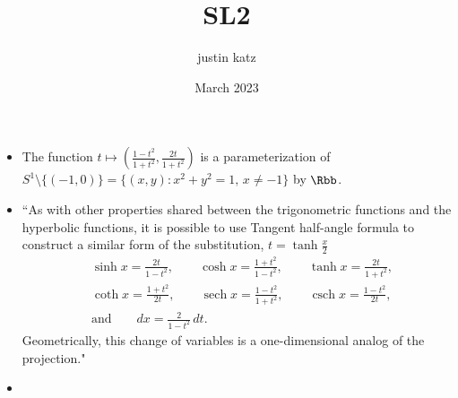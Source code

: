 \documentclass{article}
\title{SL2}
\author{justin katz}
\date{March 2023}
\begin{document}
\begin{itemize}
    \item The function $t \mapsto \left(\frac{1-t^2}{1+t^2}, \frac{2 t}{1+t^2}\right)$ is a parameterization of $S^1 \setminus \{(-1,0)\} = \{(x,y): x^2+y^2=1,\, x\neq -1\}$ by $\Rbb$.
    \item ``As with other properties shared between the trigonometric functions and the hyperbolic functions, it is possible to use Tangent half-angle formula to construct a similar form of the substitution, $t = \tanh \tfrac x2$
          \begin{align}
               & \sinh x = \frac{2t}{1 - t^2}, \qquad \cosh x = \frac{1 + t^2}{1 - t^2}, \qquad \tanh x = \frac{2t}{1 + t^2},                             \\[6pt]
               & \coth x = \frac{1 + t^2}{2t}, \qquad \operatorname{sech} x = \frac{1 - t^2}{1 + t^2}, \qquad \operatorname{csch} x = \frac{1 - t^2}{2t}, \\[6pt]
               & \text{and} \qquad dx = \frac{2}{1- t^2}\,dt.
          \end{align}
          Geometrically, this change of variables is a one-dimensional analog of the projection."
    \item  

\end{itemize}
\end{document}
